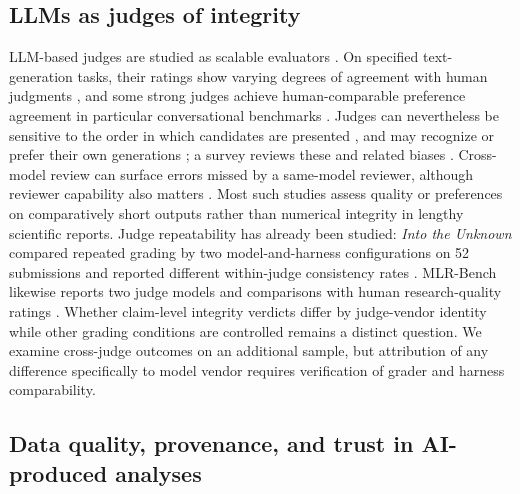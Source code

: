 \documentclass[preprint,12pt,authoryear]{elsarticle}
\begin{document}
\subsection{LLMs as judges of integrity}\label{sec:rw-judges}

LLM-based judges are studied as scalable evaluators \citep{gu2024judgesurvey}. On specified text-generation tasks, their ratings show varying degrees of agreement with human judgments \citep{chiang2023humaneval,liu2023geval}, and some strong judges achieve human-comparable preference agreement in particular conversational benchmarks \citep{zheng2023judge}. Judges can nevertheless be sensitive to the order in which candidates are presented \citep{wang2024notfair}, and may recognize or prefer their own generations \citep{panickssery2024selfpref}; a survey reviews these and related biases \citep{gu2024judgesurvey}. Cross-model review can surface errors missed by a same-model reviewer, although reviewer capability also matters \citep{song2026crossmodel}. Most such studies assess quality or preferences on comparatively short outputs rather than numerical integrity in lengthy scientific reports. Judge repeatability has already been studied: \emph{Into the Unknown} compared repeated grading by two model-and-harness configurations on 52 submissions and reported different within-judge consistency rates \citep[Appendix B]{kim2026unknown}. MLR-Bench likewise reports two judge models and comparisons with human research-quality ratings \citep{chen2025mlrbench}. Whether claim-level integrity verdicts differ by judge-vendor identity while other grading conditions are controlled remains a distinct question. We examine cross-judge outcomes on an additional sample, but attribution of any difference specifically to model vendor requires verification of grader and harness comparability.

\subsection{Data quality, provenance, and trust in AI-produced analyses}\label{sec:rw-is}
\end{document}
